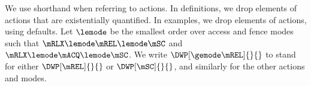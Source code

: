 We use shorthand when referring to actions.  In definitions, we drop elements
of actions that are existentially quantified.  In examples, we drop elements
of actions, using defaults.
% 
Let $\lemode$ be the smallest order over access and fence modes such that
$\mRLX\lemode\mREL\lemode\mSC$ and $\mRLX\lemode\mACQ\lemode\mSC$.
We write $\DWP[\gemode\mREL]{}{}$ to stand for either $\DWP[\mREL]{}{}$ or
$\DWP[\mSC]{}{}$, and similarly for the other actions and modes.




